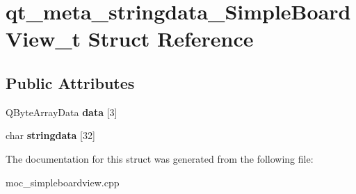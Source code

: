 \hypertarget{structqt__meta__stringdata__SimpleBoardView__t}{\section{qt\-\_\-meta\-\_\-stringdata\-\_\-\-Simple\-Board\-View\-\_\-t Struct Reference}
\label{structqt__meta__stringdata__SimpleBoardView__t}
}
\subsection*{Public Attributes}
\begin{DoxyCompactItemize}
\item 
\hypertarget{structqt__meta__stringdata__SimpleBoardView__t_a6aadce870a871cf872f666a427f13b52}{Q\-Byte\-Array\-Data {\bfseries data} \mbox{[}3\mbox{]}}\label{structqt__meta__stringdata__SimpleBoardView__t_a6aadce870a871cf872f666a427f13b52}

\item 
\hypertarget{structqt__meta__stringdata__SimpleBoardView__t_a367b2e35cbca1cbb04f957aa0864ac20}{char {\bfseries stringdata} \mbox{[}32\mbox{]}}\label{structqt__meta__stringdata__SimpleBoardView__t_a367b2e35cbca1cbb04f957aa0864ac20}

\end{DoxyCompactItemize}


The documentation for this struct was generated from the following file\-:\begin{DoxyCompactItemize}
\item 
moc\-\_\-simpleboardview.\-cpp\end{DoxyCompactItemize}
